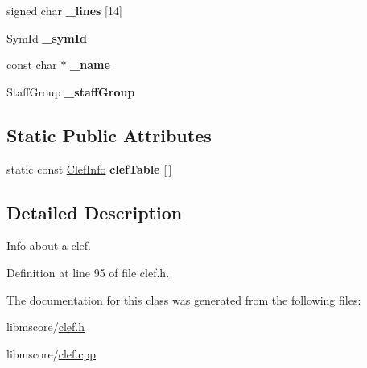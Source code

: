 \begin{DoxyCompactItemize}
\mbox{\label{class_ms_1_1_clef_info_a082e4a4e78467d2210f8780c7e907141}} 
signed char {\bfseries \+\_\+lines} \mbox{[}14\mbox{]}
\item 
\mbox{\label{class_ms_1_1_clef_info_a9c7783b42cae42c71d47a339c3b6000a}} 
Sym\+Id {\bfseries \+\_\+sym\+Id}
\item 
\mbox{\label{class_ms_1_1_clef_info_a899628cb5cfc0bae70cfd9ca05b4b257}} 
const char $\ast$ {\bfseries \+\_\+name}
\item 
\mbox{\label{class_ms_1_1_clef_info_ad70cc58efd1cbdd3144a49ed159a68cf}} 
Staff\+Group {\bfseries \+\_\+staff\+Group}
\end{DoxyCompactItemize}
\subsection*{Static Public Attributes}
\begin{DoxyCompactItemize}
\item 
\mbox{\label{class_ms_1_1_clef_info_a83e8454ac587696bdb7d53fc97f1ca6a}} 
static const \hyperlink{class_ms_1_1_clef_info}{Clef\+Info} {\bfseries clef\+Table} \mbox{[}$\,$\mbox{]}
\end{DoxyCompactItemize}


\subsection{Detailed Description}
Info about a clef. 

Definition at line 95 of file clef.\+h.



The documentation for this class was generated from the following files\+:\begin{DoxyCompactItemize}
\item 
libmscore/\hyperlink{clef_8h}{clef.\+h}\item 
libmscore/\hyperlink{clef_8cpp}{clef.\+cpp}\end{DoxyCompactItemize}
